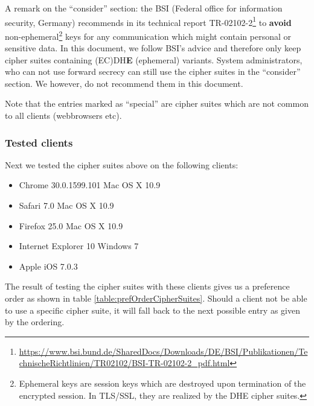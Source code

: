 A remark on the ``consider'' section: the BSI (Federal office for information security, Germany) recommends in its technical report TR-02102-2\footnote{\url{https://www.bsi.bund.de/SharedDocs/Downloads/DE/BSI/Publikationen/TechnischeRichtlinien/TR02102/BSI-TR-02102-2_pdf.html}} to \textbf{avoid} non-ephemeral\footnote{Ephemeral keys are session keys which are destroyed upon termination of the encrypted session. In TLS/SSL, they are realized by the DHE cipher suites. } keys for any communication which might contain personal or sensitive data. In this document, we follow BSI's advice and therefore only keep cipher suites containing (EC)DH\textbf{E} (ephemeral) variants. System administrators, who can not use forward secrecy can still use the cipher suites in the ``consider'' section. We however, do not recommend them in this document.


Note that the entries marked as ``special'' are cipher suites which are not common to all clients (webbrowsers etc).


\subsubsection{Tested clients}
 
Next we tested the cipher suites above on the following clients:

\begin{itemize}
\item Chrome 30.0.1599.101 Mac OS X 10.9
\item Safari 7.0 Mac OS X 10.9
\item Firefox 25.0 Mac OS X 10.9
\item Internet Explorer 10 Windows 7
\item Apple iOS 7.0.3
\end{itemize}


The result of testing the cipher suites with these clients gives us a preference order as shown in table \ref{table:prefOrderCipherSuites}. 
Should a client not be able to use a specific cipher suite, it will fall back to the next possible entry as given by the ordering.

